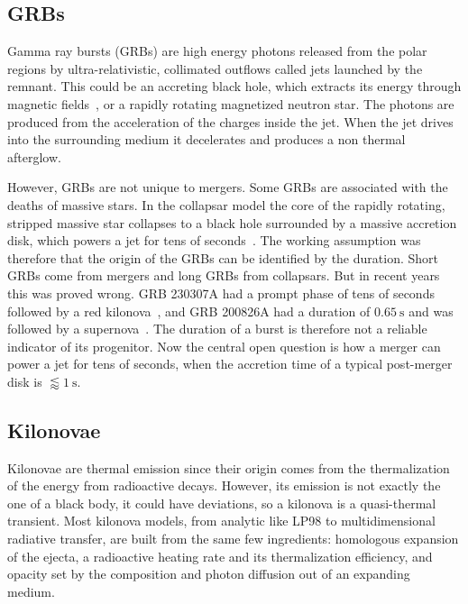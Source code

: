 \subsection{GRBs}

Gamma ray bursts (GRBs) are high energy photons released from the polar regions by ultra-relativistic, collimated outflows called jets launched by the remnant. This could be an accreting black hole, which extracts its energy through magnetic fields~\cite{blandford_electromagnetic_1977}, or a rapidly rotating magnetized neutron star.
The photons are produced from the acceleration of the charges inside the jet.
When the jet drives into the surrounding medium it decelerates and produces a non thermal afterglow.

However, GRBs are not unique to mergers.
Some GRBs are associated with the deaths of massive stars.
In the collapsar model the core of the rapidly rotating, stripped massive star collapses to a black hole surrounded by a massive accretion disk, which powers a jet for tens of seconds~\cite{woosley_gamma-ray_1993,macfadyen_collapsars_1999}. 
The working assumption was therefore that the origin of the GRBs can be identified by the duration.
Short GRBs come from mergers and long GRBs from collapsars.
But in recent years this was proved wrong.
GRB 230307A had a prompt phase of tens of seconds followed by a red kilonova~\cite{levan_heavy-element_2024,yang_lanthanide-rich_2024}, and GRB 200826A had a duration of $0.65~\mathrm{s}$ and was followed by a supernova~\cite{ahumada_discovery_2021}.
The duration of a burst is therefore not a reliable indicator of its progenitor.
Now the central open question is how a merger can power a jet for tens of seconds, when the accretion time of a typical post-merger disk is  $\lessapprox1~\mathrm{s}$.

\subsection{Kilonovae}

Kilonovae are thermal emission since their origin comes from the thermalization of the energy from radioactive decays.
However, its emission is not exactly the one of a black body, it could have deviations, so a kilonova is a quasi-thermal transient.
Most kilonova models, from analytic like LP98 to multidimensional radiative transfer, are built from the same few ingredients: homologous expansion of the ejecta, a radioactive heating rate and its thermalization efficiency, and opacity set by the composition and photon diffusion out of an expanding medium.

